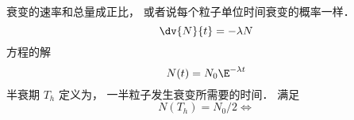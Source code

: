 
\begin{issues}
\issueDraft
\end{issues}

衰变的速率和总量成正比， 或者说每个粒子单位时间衰变的概率一样．
\begin{equation}
\dv{N}{t} = -\lambda N
\end{equation}
方程的解
\begin{equation}
N(t) = N_0 \E^{-\lambda t}
\end{equation}
半衰期 $T_h$ 定义为， 一半粒子发生衰变所需要的时间． 满足
\begin{equation}
N(T_h) = N_0/2 \iff 
\end{equation}

